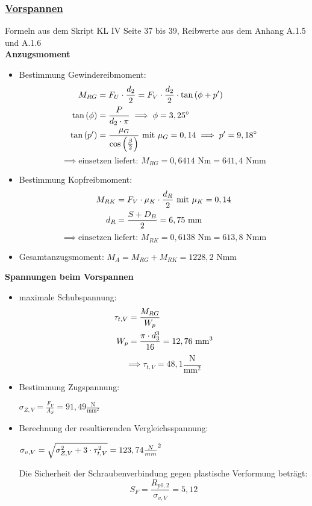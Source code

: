 \subsubsection{\underline{Vorspannen}}
Formeln aus dem Skript KL IV  Seite 37 bis 39, Reibwerte aus dem Anhang A.1.5 und A.1.6 \\
\textbf{Anzugsmoment}\\
\begin{itemize}
		\item Bestimmung Gewindereibmoment: 
		\begin{align*}
		M_{RG} &= F_U \cdot \frac{d_2}{2} = F_V\cdot \frac{d_2}{2}\cdot \tan\left(\phi + p'\right)\\
		\tan\left(\phi\right) &= \frac{P}{d_2 \cdot \pi}\implies \phi = 3,25^{\circ}\\
		\tan\left(p'\right) &= \frac{\mu_G}{\cos\left(\frac{\beta}{2}\right)} \text{ mit } \mu_G = 0,14 \implies p' = 9,18^{\circ}
		\end{align*}
		\[\implies \text{einsetzen liefert: }  M_{RG} = 0,6414 \text{ Nm} = 641,4\text{ Nmm}\]
			
		\item Bestimmung Kopfreibmoment:
		\begin{align*}
		M_{RK}&= F_V\cdot \mu_K\cdot \frac{d_R}{2} \text{ mit }\mu_K = 0,14\\
		d_R &= \frac{S+D_B}{2} = 6,75 \text{ mm}
		\end{align*}
		\[\implies \text{einsetzen liefert: }  M_{RK} = 0,6138 \text{ Nm} = 613,8\text{ Nmm} \]
		
		\item Gesamtanzugsmoment:
	$M_A = M_{RG} + M_{RK} = 1228,2 \text{ Nmm}$
\end{itemize}
\newpage
\textbf{Spannungen beim Vorspannen}
\begin{itemize}
	\item maximale Schubspannung:
	\begin{align*}
		\tau_{t,V} &= \frac{M_{RG}}{W_p}\\
		W_p &= \frac{\pi\cdot d_3^3}{16} = 12,76 \text{ mm}^3
	\end{align*}
	\[\implies \tau_{t,V} = 48,1 \frac{\text{N}}{\text{mm}^2}\]
	\item Bestimmung Zugspannung: \\
	\begin{center} $\sigma_{Z,V} = \frac{F_V}{A_S} = 91,49 \frac{\text{N}}{\text{mm}^2}$\end{center}
	\item Berechnung der resultierenden Vergleichsspannung:\\
	\begin{center}
		$\sigma_{v,V} = \sqrt{\sigma_{Z,V}^2+3\cdot\tau_{t,V}^2} = 123,74 \frac{N}{mm}^2$
	\end{center} 
	Die Sicherheit der Schraubenverbindung gegen plastische Verformung beträgt:\\ 
	\[S_F = \frac{R_{p0,2}}{\sigma_{v,V}} = 5,12\]
\end{itemize}
\newpage
